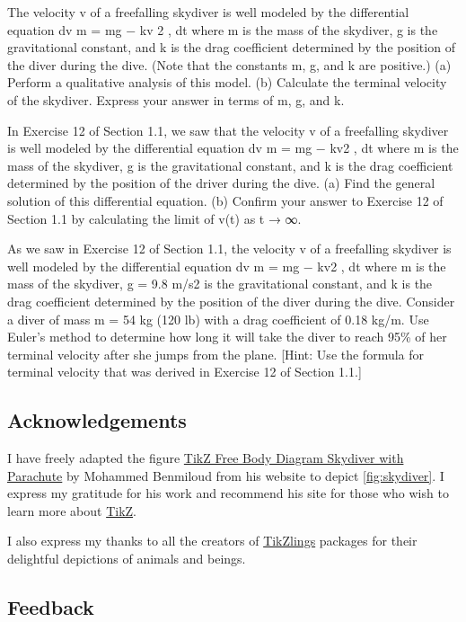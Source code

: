 \documentclass[
  a4paper,
]{article}
\begin{document}
The velocity v of a freefalling skydiver is well modeled by the
differential equation dv m = mg − kv 2 , dt where m is the mass of the
skydiver, g is the gravitational constant, and k is the drag coefficient
determined by the position of the diver during the dive. (Note that the
constants m, g, and k are positive.) (a) Perform a qualitative analysis
of this model. (b) Calculate the terminal velocity of the skydiver.
Express your answer in terms of m, g, and k.

In Exercise 12 of Section 1.1, we saw that the velocity v of a
freefalling skydiver is well modeled by the differential equation dv m =
mg − kv2 , dt where m is the mass of the skydiver, g is the
gravitational constant, and k is the drag coefficient determined by the
position of the driver during the dive. (a) Find the general solution of
this differential equation. (b) Confirm your answer to Exercise 12 of
Section 1.1 by calculating the limit of v(t) as t → ∞.

As we saw in Exercise 12 of Section 1.1, the velocity v of a freefalling
skydiver is well modeled by the differential equation dv m = mg − kv2 ,
dt where m is the mass of the skydiver, g = 9.8 m/s2 is the
gravitational constant, and k is the drag coefficient determined by the
position of the diver during the dive. Consider a diver of mass m = 54
kg (120 lb) with a drag coefficient of 0.18 kg/m. Use Euler's method to
determine how long it will take the diver to reach 95\% of her terminal
velocity after she jumps from the plane. {[}Hint: Use the formula for
terminal velocity that was derived in Exercise 12 of Section 1.1.{]}

\subsection{Acknowledgements}\label{acknowledgements}

I have freely adapted the figure
\href{https://latexdraw.com/tikz-free-body-diagram-skydiver-with-parachute/}{TikZ
Free Body Diagram Skydiver with Parachute} by Mohammed Benmiloud from
his website to depict \cref{fig:skydiver}. I express my gratitude for
his work and recommend his site for those who wish to learn more about
\href{https://en.wikipedia.org/wiki/PGF/TikZ}{TikZ}.

I also express my thanks to all the creators of
\href{https://github.com/samcarter/tikzlings}{TikZlings} packages for
their delightful depictions of animals and beings.

\subsection{Feedback}\label{feedback}
\end{document}
